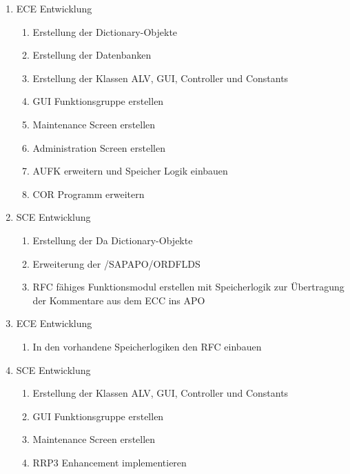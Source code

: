 \begin{enumerate}[itemsep=0em,partopsep=0em,parsep=0em,topsep=0em]
	\item ECE Entwicklung
	\begin{enumerate}
		\item Erstellung der Dictionary-Objekte
		\item Erstellung der Datenbanken
		\item Erstellung der Klassen ALV, GUI, Controller und Constants
		\item GUI Funktionsgruppe erstellen
		\item Maintenance Screen erstellen
		\item Administration Screen erstellen
		\item AUFK erweitern und Speicher Logik einbauen
		\item COR Programm erweitern
	\end{enumerate}
	\item SCE Entwicklung
	\begin{enumerate}
		\item Erstellung der Da Dictionary-Objekte
		\item Erweiterung der /SAPAPO/ORDFLDS
		\item RFC fähiges Funktionsmodul erstellen mit Speicherlogik zur Übertragung der Kommentare   aus dem ECC ins APO
	\end{enumerate}
	\item ECE Entwicklung
	\begin{enumerate}
		\item In den vorhandene Speicherlogiken den RFC einbauen
	\end{enumerate}
	\item SCE Entwicklung
	\begin{enumerate}
		\item Erstellung der Klassen ALV, GUI, Controller und Constants
		\item GUI Funktionsgruppe erstellen
		\item Maintenance Screen erstellen
		\item RRP3 Enhancement implementieren
	\end{enumerate}
\end{enumerate}